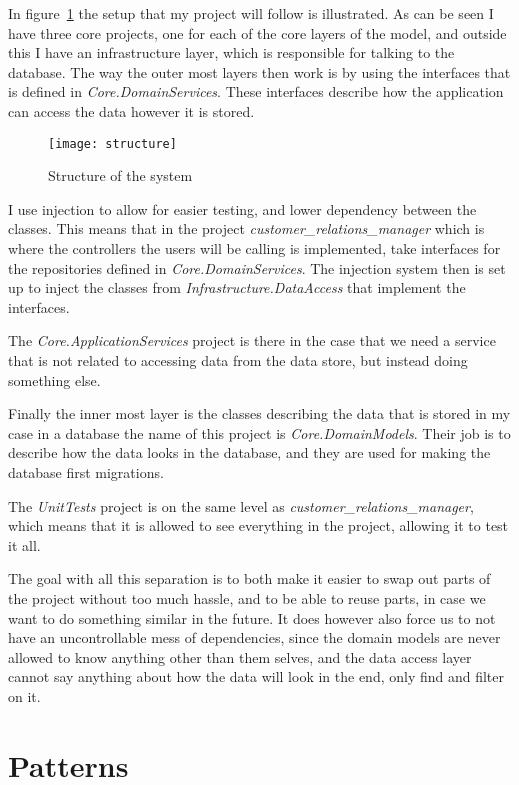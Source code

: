 In figure~\ref{fig:structure} the setup that my project will follow is illustrated. As can be seen I have three core projects, one for each of the core layers of the model, and outside this I have an infrastructure layer, which is responsible for talking to the database. The way the outer most layers then work is by using the interfaces that is defined in \textit{Core.DomainServices}. These interfaces describe how the application can access the data however it is stored.

\begin{figure}[h]
  \centering
  \texttt{[image: structure]}
  \caption{Structure of the system}
  \label{fig:structure}
\end{figure}

I use injection to allow for easier testing, and lower dependency between the classes. This means that in the project \textit{customer\_relations\_manager} which is where the controllers the users will be calling is implemented, take interfaces for the repositories defined in \textit{Core.DomainServices}. The injection system then is set up to inject the classes from \textit{Infrastructure.DataAccess} that implement the interfaces.

The \textit{Core.ApplicationServices} project is there in the case that we need a service that is not related to accessing data from the data store, but instead doing something else.

Finally the inner most layer is the classes describing the data that is stored in my case in a database the name of this project is \textit{Core.DomainModels}. Their job is to describe how the data looks in the database, and they are used for making the database first migrations.

The \textit{UnitTests} project is on the same level as \textit{customer\_relations\_manager}, which means that it is allowed to see everything in the project, allowing it to test it all.

The goal with all this separation is to both make it easier to swap out parts of the project without too much hassle, and to be able to reuse parts, in case we want to do something similar in the future. It does however also force us to not have an uncontrollable mess of dependencies, since the domain models are never allowed to know anything other than them selves, and the data access layer cannot say anything about how the data will look in the end, only find and filter on it.

\section{Patterns}
\label{sec:Patterns}

